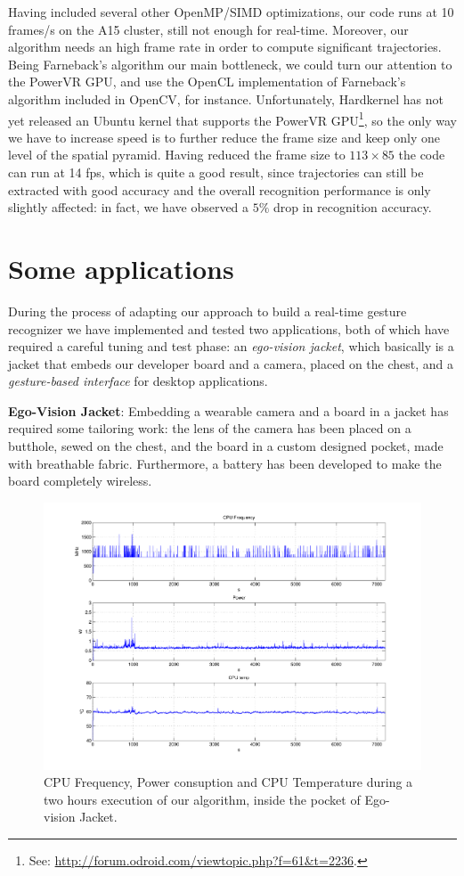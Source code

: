 Having included several other OpenMP/SIMD optimizations, our code runs at 10 frames/s on the A15 cluster, still not enough for real-time. Moreover, our algorithm needs an high frame rate in order to compute significant trajectories. Being Farneback's algorithm our main bottleneck, we could turn our attention to the PowerVR GPU, and use the OpenCL implementation of Farneback's algorithm included in OpenCV, for instance. Unfortunately, Hardkernel has not yet released an Ubuntu kernel that supports the PowerVR GPU\footnote{See: \url{http://forum.odroid.com/viewtopic.php?f=61&t=2236}.}, so the only way we have to increase speed is to further reduce the frame size and keep only one level of the spatial pyramid. Having reduced the frame size to $113\times 85$ the code can run at 14 fps, which is quite a good result, since trajectories can still be extracted with good accuracy and the overall recognition performance is only slightly affected: in fact, we have observed a $5\%$ drop in recognition accuracy.

\section{Some applications}
During the process of adapting our approach to build a real-time gesture recognizer we have implemented and tested two applications, both of which have required a careful tuning and test phase: an \textit{ego-vision jacket}, which basically is a jacket that embeds our developer board and a camera, placed on the chest, and a \textit{gesture-based interface} for desktop applications.

\textbf{Ego-Vision Jacket}: Embedding a wearable camera and a board in a jacket has required some tailoring work: the lens of the camera has been placed on a butthole, sewed on the chest, and the board in a custom designed pocket, made with breathable fabric. Furthermore, a battery has been developed to make the board completely wireless. 

\begin{figure}[t!]
\centering
\includegraphics[width=1.2\linewidth,angle=90]{Figures/consumi.pdf}
\caption{CPU Frequency, Power consuption and CPU Temperature during a two hours execution of our algorithm, inside the pocket of Ego-vision Jacket.}
\label{jacket}
\end{figure}

